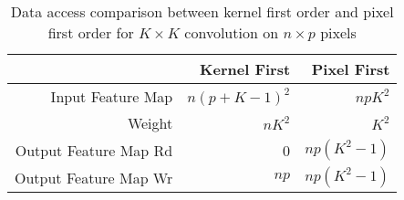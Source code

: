 \begin{table}[htbp]
    \centering
    \caption{Data access comparison between kernel first order and pixel first order for $K\times K$ convolution on $n\times p$ pixels}
      \begin{tabular}{|r|r|r|}
      \hline
            & Kernel First & Pixel First \\
      \hline
      Input Feature Map & $n(p+K-1)^2$ & $npK^2$ \\
      \hline
      Weight & $nK^2$ & $K^2$ \bigstrut\\
      \hline
      Output Feature Map Rd & 0 & $np(K^2-1)$ \\
      \hline
      Output Feature Map Wr & $np$ & $np(K^2-1)$ \\
      \hline
      \end{tabular}
    \label{tab:ram_acc}
  \end{table}